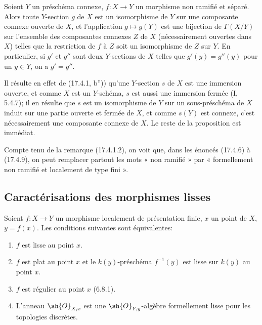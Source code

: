 \begin{proposition}[17.4.9]
\label{IV.17.4.9}
Soient $Y$ un préschéma connexe, $f:X\to Y$ un morphisme non ramifié et séparé. Alors toute $Y$-section $g$ de $X$ est un isomorphisme de $Y$ sur une composante connexe ouverte de $X$, et l'application $g\mapsto g(Y)$ est une bijection de $\Gamma(X/Y)$ sur l'ensemble des composantes connexes $Z$ de $X$ (nécessairement ouvertes dans $X$) telles que la restriction de $f$ à $Z$ soit un isomorphisme de $Z$ sur $Y$. En particulier, si $g'$ et $g''$ sont deux $Y$-sections de $X$ telles que $g'(y)=g''(y)$ pour un $y\in Y$, on a $g'=g''$.
\end{proposition}

Il résulte en effet de (17.4.1, b'')) qu'une $Y$-section $s$ de $X$ est une immersion ouverte, et comme $X$ est un $Y$-schéma, $s$ est aussi une immersion fermée (I, 5.4.7); il en résulte que $s$ est un isomorphisme de $Y$ sur un sous-préschéma de $X$ induit sur une partie ouverte et fermée de $X$, et comme $s(Y)$ est connexe, c'est nécessairement une composante connexe de $X$. Le reste de la proposition est immédiat.

\begin{remark}[17.4.10]
\label{IV.17.4.10}
Compte tenu de la remarque (17.4.1.2), on voit que, dans les énoncés (17.4.6) à (17.4.9), on peut remplacer partout les mots « non ramifié » par « formellement non ramifié et localement de type fini ».
\end{remark}

\subsection{Caractérisations des morphismes lisses}
\label{subsection:IV.17.5}

\begin{theorem}[17.5.1]
\label{IV.17.5.1}
Soient $f:X\to Y$ un morphisme localement de présentation finie, $x$ un point de $X$, $y=f(x)$. Les conditions suivantes sont équivalentes:
\begin{enumerate}
  \item[a)] $f$ est lisse au point $x$.
  \item[b)] $f$ est plat au point $x$ et le $k(y)$-préschéma $f^{-1}(y)$ est lisse sur $k(y)$ au point $x$.
  \item[b')] $f$ est régulier au point $x$ (6.8.1).
  \item[c)] L'anneau $\sh{O}_{X,x}$ est une $\sh{O}_{Y,y}$-algèbre formellement lisse pour les topologies discrètes.
\end{enumerate}
\end{theorem}

